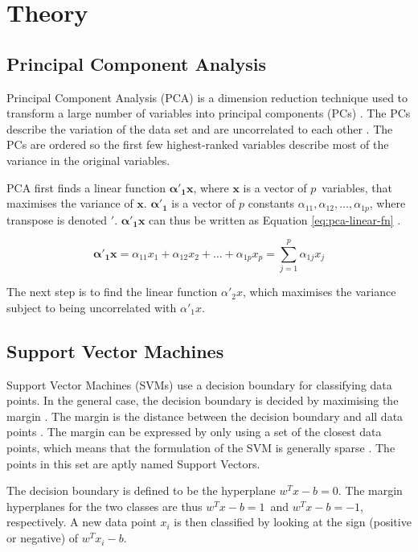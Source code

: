 \chapter{Theory}
\label{cha:theory}

\section{Principal Component Analysis}
Principal Component Analysis (PCA) is a dimension reduction technique used to transform a large number of variables into principal components (PCs) \cite{Jolliffe2002}.
The PCs describe the variation of the data set and are uncorrelated to each other \cite{Jolliffe2002}.
The PCs are ordered so the first few highest-ranked variables describe most of the variance in the original variables.

PCA first finds a linear function $\bm{\alpha'_1x}$, where $\bm{x}$ is a vector of $p$ variables, that maximises the variance of $\bm{x}$.
$\bm{\alpha'_1}$ is a vector of $p$ constants $\alpha_{11}, \alpha_{12}, \dots, \alpha_{1p}$, where transpose is denoted $'$.
$\bm{\alpha'_1x}$ can thus be written as Equation \ref{eq:pca-linear-fn} \cite{Jolliffe2002}.

\begin{equation} \label{eq:pca-linear-fn}
    \bm{\alpha'_1x} = \alpha_{11}x_1 + \alpha_{12}x_2 + \dots + \alpha_{1p}x_p = \sum_{j=1}^{p}\alpha_{1j}x_j
\end{equation}

The next step is to find the linear function $\alpha'_2x$, which maximises the variance subject to being uncorrelated with $\alpha'_1x$. 
\section{Support Vector Machines}

Support Vector Machines (SVMs) use a decision boundary for classifying data points.
In the general case, the decision boundary is decided by maximising the margin \cite{Bishop2006}. 
The margin is the distance between the decision boundary and all data points \cite{Cortes1995}.
The margin can be expressed by only using a set of the closest data points, which means that the formulation of the SVM is generally sparse \cite{Bishop2006}.
The points in this set are aptly named Support Vectors.

The decision boundary is defined to be the hyperplane $w^Tx - b = 0$.
The margin hyperplanes for the two classes are thus $w^Tx - b = 1$ and $w^Tx -b = -1$, respectively.
A new data point $x_i$ is then classified by looking at the sign (positive or negative) of $w^T x_i - b$. 


